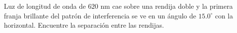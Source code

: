 \item Luz de longitud de onda de $620\text{ nm}$ cae sobre una rendija doble y la primera franja brillante del patrón de interferencia se ve en un ángulo de $15.0^\circ$ con la horizontal. Encuentre la separación entre las rendijas.